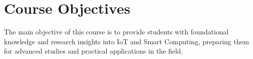 
\section{Course Objectives}

The main objective of this course is to provide students with foundational knowledge and research insights into IoT and Smart Computing, preparing them for advanced studies and practical applications in the field.